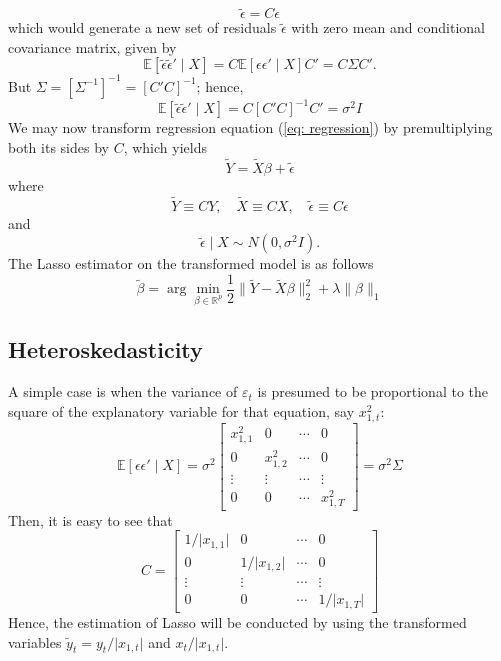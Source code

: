 \documentclass[10pt,handout,english]{beamer}
\newcommand{\E}{\mathbb{E}}
\newcommand{\R}{\mathbb{R}}
\begin{document}
\begin{frame}[allowframebreaks]
\[
\tilde{\epsilon}=C\epsilon
\]
which would generate a new set of residuals $\tilde{\epsilon}$ with zero mean and conditional covariance matrix, given by 
\[
\E[\tilde{\epsilon}\tilde{\epsilon}'\mid X]=C\E[\epsilon\epsilon'\mid X]C'=C\Sigma C'.
\]
But $\Sigma=\left[\Sigma^{-1}\right]^{-1}=[C'C]^{-1}$; hence,
\[
\E[\tilde{\epsilon}\tilde{\epsilon}'\mid X]=C[C'C]^{-1}C'=\sigma^2I
\]
We may now transform regression equation (\ref{eq: regression}) by premultiplying both its sides by $C$, which yields
\[
\tilde{Y}=\tilde{X}\beta+\tilde{\epsilon}
\]
where
\[
\tilde{Y}\equiv CY,\quad\tilde{X}\equiv CX,\quad\tilde{\epsilon}\equiv C\epsilon
\]
and 
\[
\tilde{\epsilon}\mid X\sim N(0,\sigma^2I).
\]
The Lasso estimator on the transformed model is as follows
\[
\tilde{\beta}=\arg\min_{\beta\in\R^p}\frac{1}{2}\lVert \tilde{Y}-\tilde{X}\beta\rVert_2^2+\lambda\lVert\beta\rVert_1
\]
\end{frame}
\subsection{Heteroskedasticity}
\begin{frame}[allowframebreaks]
A simple case is when the variance of $\varepsilon_t$ is presumed to be proportional to the square of the explanatory variable for that equation, say $x_{1,t}^2$:
\[
\E[\epsilon \epsilon'\mid X]=\sigma^2
\begin{bmatrix}
x_{1,1}^2 &0&\cdots&0\\
0&x_{1,2}^2&\cdots&0\\
\vdots&\vdots&\cdots&\vdots\\
0&0&\cdots&x_{1,T}^2
\end{bmatrix}
=\sigma^2\Sigma
\]
Then, it is easy to see that 
\[
C=
\begin{bmatrix}
1/\lvert x_{1,1}\rvert &0&\cdots&0\\
0&1/\lvert x_{1,2}\rvert&\cdots&0\\
\vdots&\vdots&\cdots&\vdots\\
0&0&\cdots&1/\lvert x_{1,T}\rvert
\end{bmatrix}
\]
Hence, the estimation of Lasso will be conducted by using the transformed variables $\tilde{y}_t=y_t/\lvert x_{1,t}\rvert$ and $x_t/\lvert x_{1,t}\rvert$. 
\end{frame}
\end{document}
